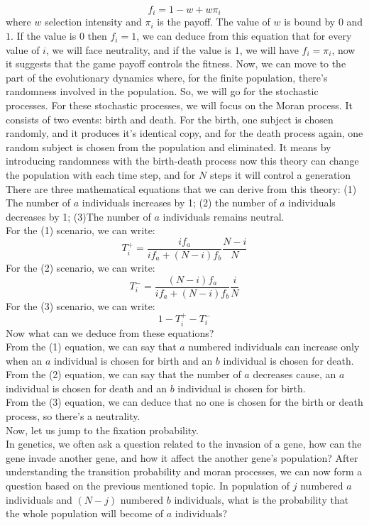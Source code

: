 \documentclass{article}
\begin{document}
\[f_i=1-w+w\pi_i\]
where $w$ selection intensity and $\pi_i$ is the payoff. The value of $w$ is bound by  $0$ and $1$. If the value is $0$ then $f_i=1$, we can deduce from this equation that for every value of $i$, we will face neutrality, and if the value is $1$, we will have $f_i=\pi_i$, now it suggests that the game payoff controls the fitness.
Now, we can move to the part of the evolutionary dynamics where, for the finite population, there's randomness involved in the population. So, we will go for the stochastic processes.
For these stochastic processes, we will focus on the Moran process. It consists of two events: birth and death. For the birth, one subject is chosen randomly, and it produces it's identical copy, and for the death process again, one random subject is chosen from the population and eliminated. It means by introducing randomness with the birth-death process now this theory can change the population with each time step, and for $N$ steps it will control a generation \cite{Moran1962}
There are three mathematical equations that we can derive from this theory: (1) The number of $a$ individuals increases by 1; (2) the number of $a$ individuals decreases by 1; (3)The number of $a$ individuals remains neutral.\\
For the (1) scenario, we can write:
\[T_i^+=\frac{if_a}{if_a+(N-i)f_b}\frac{N-i}{N}\]
For the (2) scenario, we can write:
\[T_i^-=\frac{(N-i)f_a}{if_a+(N-i)f_b}\frac{i}{N}\]
For the (3) scenario, we can write:
\[1-T_i^+-T_i^-\]
Now what can we deduce from these equations?\\
From the (1) equation, we can say that $a$ numbered individuals can increase only when an $a$ individual is chosen for birth and an $b$ individual is chosen for death.\\
From the (2) equation, we can say that the number of $a$ decreases cause, an $a$ individual is chosen for death and an $b$ individual is chosen for birth.\\
From the (3) equation, we can deduce that no one is chosen for the birth or death process, so there's a neutrality.\\
Now, let us jump to the fixation probability.\\
In genetics, we often ask a question related to the invasion of a gene, how can the gene invade another gene, and how it affect the another gene's population?
After understanding the transition probability and moran processes, we can now form a question based on the previous mentioned topic. In population of $j$ numbered $a$ individuals and $(N-j)$ numbered $b$ individuals, what is the probability that the whole population will become of $a$ individuals?
\end{document}

